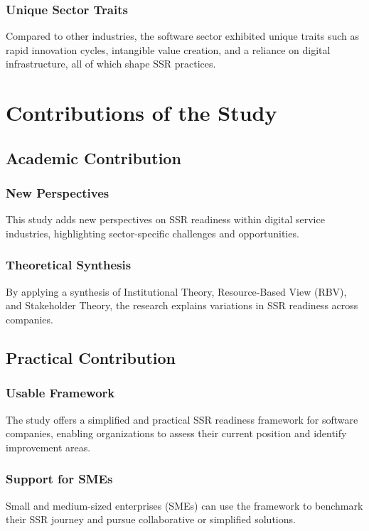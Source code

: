 \subsubsection{Unique Sector Traits}
Compared to other industries, the software sector exhibited unique traits such as rapid innovation cycles, intangible value creation, and a reliance on digital infrastructure, all of which shape SSR practices.

\section{Contributions of the Study}
\subsection{Academic Contribution}
\subsubsection{New Perspectives}
This study adds new perspectives on SSR readiness within digital service industries, highlighting sector-specific challenges and opportunities.

\subsubsection{Theoretical Synthesis}
By applying a synthesis of Institutional Theory, Resource-Based View (RBV), and Stakeholder Theory, the research explains variations in SSR readiness across companies.

\subsection{Practical Contribution}
\subsubsection{Usable Framework}
The study offers a simplified and practical SSR readiness framework for software companies, enabling organizations to assess their current position and identify improvement areas.

\subsubsection{Support for SMEs}
Small and medium-sized enterprises (SMEs) can use the framework to benchmark their SSR journey and pursue collaborative or simplified solutions.

